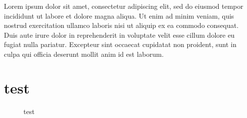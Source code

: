 \documentclass{article}
\begin{document}
\tableofcontents

Lorem ipsum dolor sit amet, consectetur adipiscing elit, sed do eiusmod tempor incididunt ut labore et dolore magna aliqua. Ut enim ad minim veniam, quis nostrud exercitation ullamco laboris nisi ut aliquip ex ea commodo consequat. Duis aute irure dolor in reprehenderit in voluptate velit esse cillum dolore eu fugiat nulla pariatur. Excepteur sint occaecat cupidatat non proident, sunt in culpa qui officia deserunt mollit anim id est laborum.

\section{test}


\begin{figure}[ht]
    \centering
    \caption{test}
    \label{fig:test}
\end{figure}
\end{document}
